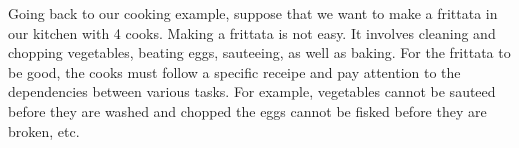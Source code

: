 
\begin{example}
Going back to our cooking example, suppose that we want to make a
frittata in our kitchen with 4 cooks.
%
Making a frittata is not easy.
%
It involves cleaning and chopping vegetables, beating eggs,
sauteeing, as well as baking.
%
For the frittata to be good, the cooks must follow a specific receipe
and pay attention to the dependencies between various tasks.
%
For example,
%
vegetables cannot be sauteed before they are washed and chopped
%
the eggs cannot be fisked before they are broken, etc.
%
\end{example}

